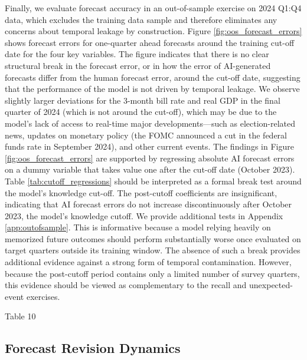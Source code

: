 \documentclass[11pt,letterpaper]{scrartcl}
\begin{document}
Finally, we evaluate forecast accuracy in an out-of-sample exercise on 2024 Q1:Q4 data, which excludes the training data sample and therefore eliminates any concerns about temporal leakage by construction. Figure \ref{fig:oos_forecast_errors} shows forecast errors for one-quarter ahead forecasts around the training cut-off date for the four key variables. The figure indicates that there is no clear structural break in the forecast error, or in how the error of AI-generated forecasts differ from the human forecast error, around the cut-off date, suggesting that the performance of the model is not driven by temporal leakage. We observe slightly larger deviations for the 3-month bill rate and real GDP in the final quarter of 2024 (which is not around the cut-off), which may be due to the model’s lack of access to real-time major developments—such as election-related news, updates on monetary policy (the FOMC announced a cut in the federal funds rate in September 2024), and other current events. The findings in Figure \ref{fig:oos_forecast_errors} are supported by regressing absolute AI forecast errors on a dummy variable that takes value one after the cut-off date (October 2023). Table \ref{tab:cutoff_regressions} should be interpreted as a formal break test around the model’s knowledge cut-off. The post-cutoff coefficients are insignificant, indicating that AI forecast errors do not increase discontinuously after October 2023, the model's knowledge cutoff. We provide additional tests in Appendix \ref{app:outofsample}. This is informative because a model relying heavily on memorized future outcomes should perform substantially worse once evaluated on target quarters outside its training window. The absence of such a break provides additional evidence against a strong form of temporal contamination. However, because the post-cutoff period contains only a limited number of survey quarters, this evidence should be viewed as complementary to the recall and unexpected-event exercises.

Table 10 

\subsection{Forecast Revision Dynamics}\label{sec:revisions}
\end{document}
